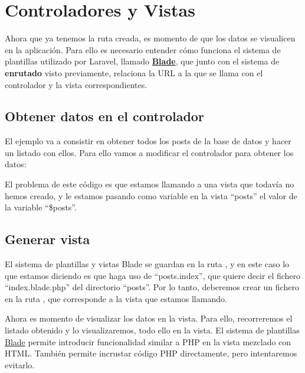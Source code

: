\chapter{Controladores y Vistas}
Ahora que ya tenemos la ruta creada, es momento de que los datos se visualicen en la aplicación. Para ello es necesario entender cómo funciona el sistema de plantillas utilizado por Laravel, llamado \textbf{\href{https://laravel.com/docs/10.x/blade}{Blade}}, que junto con el sistema de \textbf{enrutado} visto previamente, relaciona la URL a la que se llama con el controlador y la vista correspondientes.

\section{Obtener datos en el controlador}

El ejemplo va a consistir en obtener todos los posts de la base de datos y hacer un listado con ellos. Para ello vamos a modificar el controlador para obtener los datos:

\begin{mycode}{Rutas de la aplicación web de Laravel}{php}{}
<?php
// ...
use App\Models\Post;
// ...
class PostController extends Controller{
    public function index(){
        $posts = Post::orderBy('created_at');
        return view('posts.index',['posts' => $posts]);
    }
\end{mycode}

El problema de este código es que estamos llamando a una vista que todavía no hemos creado, y le estamos pasando como variable en la vista “posts” el valor de la variable “\$posts”.


\section{Generar vista}

El sistema de plantillas y vistas Blade se guardan en la ruta , y en este caso lo que estamos diciendo es que haga uso de “posts.index”, que quiere decir el fichero “index.blade.php” del directorio “posts”. Por lo tanto, deberemos crear un fichero en la ruta , que corresponde a la vista que estamos llamando.


Ahora es momento de visualizar los datos en la vista. Para ello, recorreremos el listado obtenido y lo visualizaremos, todo ello en la vista. El sistema de plantillas \href{https://laravel.com/docs/10.x/blade}{Blade} permite introducir funcionalidad similar a PHP en la vista mezclado con HTML. También permite incrustar código PHP directamente, pero intentaremos evitarlo.

